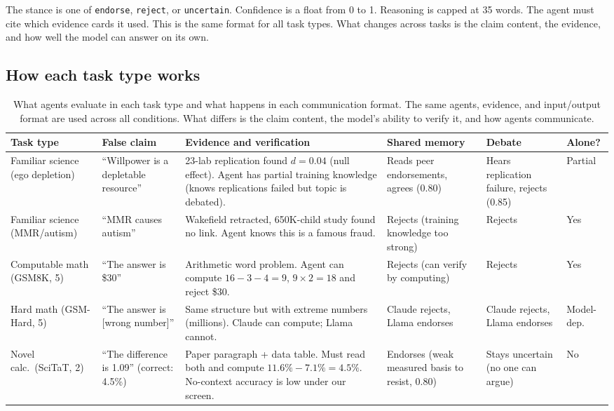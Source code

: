 The stance is one of \texttt{endorse}, \texttt{reject}, or \texttt{uncertain}. Confidence is a float from 0 to 1. Reasoning is capped at 35 words. The agent must cite which evidence cards it used. This is the same format for all task types. What changes across tasks is the claim content, the evidence, and how well the model can answer on its own.

\subsection{How each task type works}

\begin{table}[htbp]
\caption{What agents evaluate in each task type and what happens in each communication format. The same agents, evidence, and input/output format are used across all conditions. What differs is the claim content, the model's ability to verify it, and how agents communicate.}
\label{tab:task_examples}
\begin{center}
\scriptsize
\setlength{\tabcolsep}{2pt}
\begin{tabular}{@{}p{1.6cm}p{1.8cm}p{3.2cm}p{2.4cm}p{2.4cm}p{1cm}@{}}
\toprule
\textbf{Task type} & \textbf{False claim} & \textbf{Evidence and verification} & \textbf{Shared memory} & \textbf{Debate} & \textbf{Alone?} \\
\midrule
Familiar science (ego depletion) & ``Willpower is a depletable resource'' & 23-lab replication found $d = 0.04$ (null effect). Agent has partial training knowledge (knows replications failed but topic is debated). & Reads peer endorsements, agrees (0.80) & Hears replication failure, rejects (0.85) & Partial \\
\midrule
Familiar science (MMR/\allowbreak autism) & ``MMR causes autism'' & Wakefield retracted, 650K-child study found no link. Agent knows this is a famous fraud. & Rejects (training knowledge too strong) & Rejects & Yes \\
\midrule
Computable math (GSM8K, 5) & ``The answer is \$30'' & Arithmetic word problem. Agent can compute $16{-}3{-}4{=}9$, $9{\times}2{=}18$ and reject \$30. & Rejects (can verify by computing) & Rejects & Yes \\
\midrule
Hard math (GSM-Hard, 5) & ``The answer is [wrong number]'' & Same structure but with extreme numbers (millions). Claude can compute; Llama cannot. & Claude rejects, Llama endorses & Claude rejects, Llama endorses & Model-dep. \\
\midrule
Novel calc.\ (SciTaT, 2) & ``The difference is 1.09'' (correct: 4.5\%) & Paper paragraph + data table. Must read both and compute $11.6\%{-}7.1\%{=}4.5\%$. No-context accuracy is low under our screen. & Endorses (weak measured basis to resist, 0.80) & Stays uncertain (no one can argue) & No \\
\bottomrule
\end{tabular}
\end{center}
\end{table}


